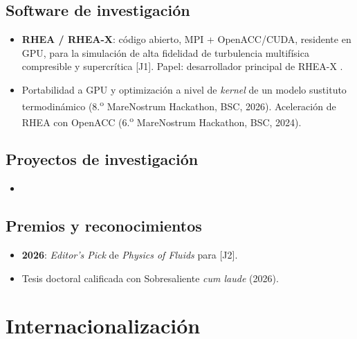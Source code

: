 \documentclass[11pt]{article}
\begin{document}
\subsection{Software de investigaci\'on}
\begin{itemize}
  \item \textbf{RHEA / RHEA-X}: c\'odigo abierto, MPI + OpenACC/CUDA, residente en GPU, para
  la simulaci\'on de alta fidelidad de turbulencia multif\'isica compresible y supercr\'itica
  [J1]. Papel: desarrollador principal de RHEA-X .
  \item Portabilidad a GPU y optimizaci\'on a nivel de \emph{kernel} de un modelo sustituto
  termodin\'amico (8.\textsuperscript{o} MareNostrum Hackathon, BSC, 2026). Aceleraci\'on de
  RHEA con OpenACC (6.\textsuperscript{o} MareNostrum Hackathon, BSC, 2024).
\end{itemize}

\subsection{Proyectos de investigaci\'on}
\begin{itemize}
  \item {}
\end{itemize}

\subsection{Premios y reconocimientos}
\begin{itemize}
  \item \textbf{2026}: \emph{Editor's Pick} de \emph{Physics of Fluids} para [J2].
  \item Tesis doctoral calificada con Sobresaliente \emph{cum laude} (2026).
\end{itemize}

\section{Internacionalizaci\'on}
\end{document}
